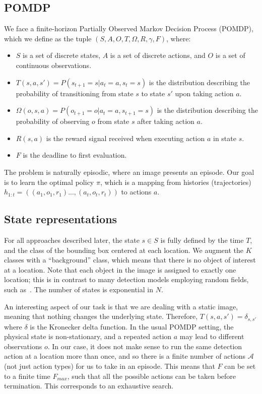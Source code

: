 \subsection{POMDP}
We face a finite-horizon Partially Observed Markov Decision Process (POMDP), which we define as the tuple $(S,A,O,T,\Omega,R,\gamma,F)$, where:
\begin{itemize}
  \item $S$ is a set of discrete states, $A$ is a set of discrete actions, and $O$ is a set of continuous observations.
  \item $T(s,a,s') = P(s_{t+1} = s | a_t = a, s_t = s)$ is the distribution describing the probability of transitioning from state $s$ to state $s'$ upon taking action $a$.
  \item $\Omega(o,s,a) = P(o_{t+1}=o | a_t = a, s_{t+1} = s)$ is the distribution describing the probability of observing $o$ from state $s$ after taking action $a$.
  \item $R(s,a)$ is the reward signal received when executing action $a$ in state $s$.
  \item $F$ is the deadline to first evaluation.
\end{itemize}

The problem is naturally episodic, where an image presents an episode.
Our goal is to learn the optimal policy $\pi$, which is a mapping from histories (trajectories) $h_{1:t}=((a_1,o_1,r_1)...,(a_t,o_t,r_t))$ to actions $a$.

\subsection{State representations}
For all approaches described later, the state $s \in S$ is fully defined by the time $T$, and the class of the bounding box centered at each location.
We augment the $K$ classes with a ``background'' class, which means that there is no object of interest at a location.
Note that each object in the image is assigned to exactly one location; this is in contrast to many detection models employing random fields, such as~\cite{Torralba2004}.
The number of states is exponential in $N$.

An interesting aspect of our task is that we are dealing with a static image, meaning that nothing changes the underlying state.
Therefore, $T(s,a,s') = \delta_{s, s'}$ where $\delta$ is the Kronecker delta function.
In the usual POMDP setting, the physical state is non-stationary, and a repeated action $a$ may lead to different observations $o$.
In our case, it does not make sense to run the same detection action at a location more than once, and so there is a finite number of actions $\mathcal A$ (not just action types) for us to take in an episode.
This means that $F$ can be set to a finite time $F_{max}$, such that all the possible actions can be taken before termination.
This corresponds to an exhaustive search.

